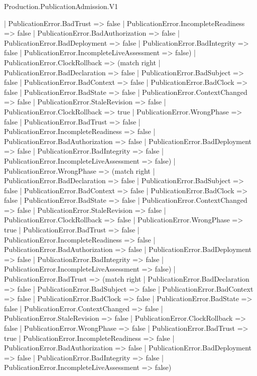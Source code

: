 \begin{lexlean}{Production.PublicationAdmission.V1}
\begin{semanticmodule}
{      | PublicationError.BadTrust => false
      | PublicationError.IncompleteReadiness => false
      | PublicationError.BadAuthorization => false
      | PublicationError.BadDeployment => false
      | PublicationError.BadIntegrity => false
      | PublicationError.IncompleteLiveAssessment => false)
    | PublicationError.ClockRollback => (match right
      | PublicationError.BadDeclaration => false
      | PublicationError.BadSubject => false
      | PublicationError.BadContext => false
      | PublicationError.BadClock => false
      | PublicationError.BadState => false
      | PublicationError.ContextChanged => false
      | PublicationError.StaleRevision => false
      | PublicationError.ClockRollback => true
      | PublicationError.WrongPhase => false
      | PublicationError.BadTrust => false
      | PublicationError.IncompleteReadiness => false
      | PublicationError.BadAuthorization => false
      | PublicationError.BadDeployment => false
      | PublicationError.BadIntegrity => false
      | PublicationError.IncompleteLiveAssessment => false)
    | PublicationError.WrongPhase => (match right
      | PublicationError.BadDeclaration => false
      | PublicationError.BadSubject => false
      | PublicationError.BadContext => false
      | PublicationError.BadClock => false
      | PublicationError.BadState => false
      | PublicationError.ContextChanged => false
      | PublicationError.StaleRevision => false
      | PublicationError.ClockRollback => false
      | PublicationError.WrongPhase => true
      | PublicationError.BadTrust => false
      | PublicationError.IncompleteReadiness => false
      | PublicationError.BadAuthorization => false
      | PublicationError.BadDeployment => false
      | PublicationError.BadIntegrity => false
      | PublicationError.IncompleteLiveAssessment => false)
    | PublicationError.BadTrust => (match right
      | PublicationError.BadDeclaration => false
      | PublicationError.BadSubject => false
      | PublicationError.BadContext => false
      | PublicationError.BadClock => false
      | PublicationError.BadState => false
      | PublicationError.ContextChanged => false
      | PublicationError.StaleRevision => false
      | PublicationError.ClockRollback => false
      | PublicationError.WrongPhase => false
      | PublicationError.BadTrust => true
      | PublicationError.IncompleteReadiness => false
      | PublicationError.BadAuthorization => false
      | PublicationError.BadDeployment => false
      | PublicationError.BadIntegrity => false
      | PublicationError.IncompleteLiveAssessment => false)
}
\end{semanticmodule}
\end{lexlean}
